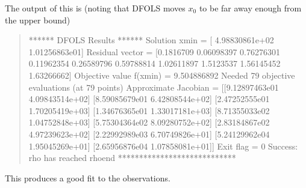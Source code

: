 \documentclass[letterpaper,10pt,english]{sphinxmanual}
\begin{document}
The output of this is (noting that DFO\sphinxhyphen{}LS moves \(x_0\) to be far away enough from the upper bound)
\begin{quote}

\begin{sphinxVerbatim}[commandchars=\\\{\}]
****** DFO\PYGZhy{}LS Results ******
Solution xmin = [ 4.98830861e+02 \PYGZhy{}1.01256863e\PYGZhy{}01]
Residual vector = [\PYGZhy{}0.1816709   0.06098397  0.76276301  0.11962354 \PYGZhy{}0.26589796 \PYGZhy{}0.59788814
 \PYGZhy{}1.02611897 \PYGZhy{}1.5123537  \PYGZhy{}1.56145452 \PYGZhy{}1.63266662]
Objective value f(xmin) = 9.504886892
Needed 79 objective evaluations (at 79 points)
Approximate Jacobian = [[\PYGZhy{}9.12897463e\PYGZhy{}01 \PYGZhy{}4.09843514e+02]
 [\PYGZhy{}8.59085679e\PYGZhy{}01 \PYGZhy{}6.42808544e+02]
 [\PYGZhy{}2.47252555e\PYGZhy{}01 \PYGZhy{}1.70205419e+03]
 [\PYGZhy{}1.34676365e\PYGZhy{}01 \PYGZhy{}1.33017181e+03]
 [\PYGZhy{}8.71355033e\PYGZhy{}02 \PYGZhy{}1.04752848e+03]
 [\PYGZhy{}5.75304364e\PYGZhy{}02 \PYGZhy{}8.09280752e+02]
 [\PYGZhy{}2.83184867e\PYGZhy{}02 \PYGZhy{}4.97239623e+02]
 [\PYGZhy{}2.22992989e\PYGZhy{}03 \PYGZhy{}6.70749826e+01]
 [\PYGZhy{}5.24129962e\PYGZhy{}04 \PYGZhy{}1.95045269e+01]
 [\PYGZhy{}2.65956876e\PYGZhy{}04 \PYGZhy{}1.07858081e+01]]
Exit flag = 0
Success: rho has reached rhoend
****************************
\end{sphinxVerbatim}
\end{quote}

This produces a good fit to the observations.

\end{document}
